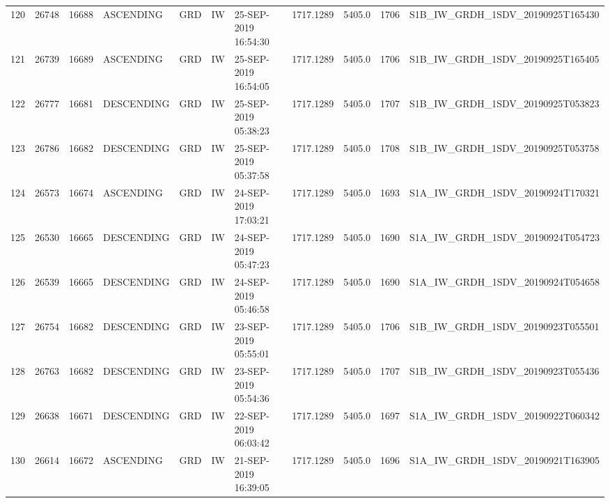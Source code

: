 \begin{tabular}{lrrllllllll}
120 &  26748 &   16688 &   ASCENDING &          GRD &              IW &  25-SEP-2019 16:54:30 &                  1717.1289 &          5405.0 &       1706 &  S1B\_IW\_GRDH\_1SDV\_20190925T165430 \\
121 &  26739 &   16689 &   ASCENDING &          GRD &              IW &  25-SEP-2019 16:54:05 &                  1717.1289 &          5405.0 &       1706 &  S1B\_IW\_GRDH\_1SDV\_20190925T165405 \\
122 &  26777 &   16681 &  DESCENDING &          GRD &              IW &  25-SEP-2019 05:38:23 &                  1717.1289 &          5405.0 &       1707 &  S1B\_IW\_GRDH\_1SDV\_20190925T053823 \\
123 &  26786 &   16682 &  DESCENDING &          GRD &              IW &  25-SEP-2019 05:37:58 &                  1717.1289 &          5405.0 &       1708 &  S1B\_IW\_GRDH\_1SDV\_20190925T053758 \\
124 &  26573 &   16674 &   ASCENDING &          GRD &              IW &  24-SEP-2019 17:03:21 &                  1717.1289 &          5405.0 &       1693 &  S1A\_IW\_GRDH\_1SDV\_20190924T170321 \\
125 &  26530 &   16665 &  DESCENDING &          GRD &              IW &  24-SEP-2019 05:47:23 &                  1717.1289 &          5405.0 &       1690 &  S1A\_IW\_GRDH\_1SDV\_20190924T054723 \\
126 &  26539 &   16665 &  DESCENDING &          GRD &              IW &  24-SEP-2019 05:46:58 &                  1717.1289 &          5405.0 &       1690 &  S1A\_IW\_GRDH\_1SDV\_20190924T054658 \\
127 &  26754 &   16682 &  DESCENDING &          GRD &              IW &  23-SEP-2019 05:55:01 &                  1717.1289 &          5405.0 &       1706 &  S1B\_IW\_GRDH\_1SDV\_20190923T055501 \\
128 &  26763 &   16682 &  DESCENDING &          GRD &              IW &  23-SEP-2019 05:54:36 &                  1717.1289 &          5405.0 &       1707 &  S1B\_IW\_GRDH\_1SDV\_20190923T055436 \\
129 &  26638 &   16671 &  DESCENDING &          GRD &              IW &  22-SEP-2019 06:03:42 &                  1717.1289 &          5405.0 &       1697 &  S1A\_IW\_GRDH\_1SDV\_20190922T060342 \\
130 &  26614 &   16672 &   ASCENDING &          GRD &              IW &  21-SEP-2019 16:39:05 &                  1717.1289 &          5405.0 &       1696 &  S1A\_IW\_GRDH\_1SDV\_20190921T163905 \\

\end{tabular}
